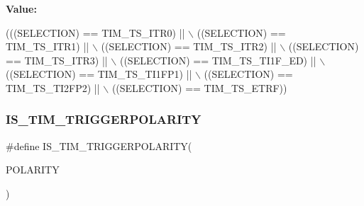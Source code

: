 {\bfseries Value\+:}
\begin{DoxyCode}
(((SELECTION) == TIM\_TS\_ITR0) || \(\backslash\)
                                             ((SELECTION) == TIM\_TS\_ITR1) || \(\backslash\)
                                             ((SELECTION) == TIM\_TS\_ITR2) || \(\backslash\)
                                             ((SELECTION) == TIM\_TS\_ITR3) || \(\backslash\)
                                             ((SELECTION) == TIM\_TS\_TI1F\_ED) || \(\backslash\)
                                             ((SELECTION) == TIM\_TS\_TI1FP1) || \(\backslash\)
                                             ((SELECTION) == TIM\_TS\_TI2FP2) || \(\backslash\)
                                             ((SELECTION) == TIM\_TS\_ETRF))
\end{DoxyCode}
\mbox{\label{group___t_i_m___i_s___t_i_m___definitions_ga1ef30af856d490f62cf34943b604a8cf}} 
\subsubsection{\texorpdfstring{I\+S\+\_\+\+T\+I\+M\+\_\+\+T\+R\+I\+G\+G\+E\+R\+P\+O\+L\+A\+R\+I\+TY}{IS\_TIM\_TRIGGERPOLARITY}}
{\footnotesize\ttfamily \#define I\+S\+\_\+\+T\+I\+M\+\_\+\+T\+R\+I\+G\+G\+E\+R\+P\+O\+L\+A\+R\+I\+TY(\begin{DoxyParamCaption}\item[{}]{P\+O\+L\+A\+R\+I\+TY }\end{DoxyParamCaption})}

